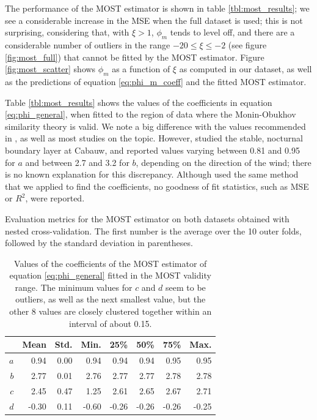 \documentclass[a4paper]{book}
\begin{document}
The performance of the MOST estimator is shown in table \ref{tbl:most_results}; we see a considerable increase in the MSE when the full dataset is used; this is not surprising, considering that, with $\xi>1$, $\phi_m$ tends to level off, and there are a considerable number of outliers in the range $-20\leq\xi\leq-2$ (see figure \ref{fig:most_full}) that cannot be fitted by the MOST estimator. Figure \ref{fig:most_scatter} shows $\phi_m$ as a function of $\xi$ as computed in our dataset, as well as the predictions of equation \ref{eq:phi_m_coeff} and the fitted MOST estimator.
 
Table \ref{tbl:most_results} shows the values of the coefficients in equation \ref{eq:phi_general}, when fitted to the region of data where the Monin-Obukhov similarity theory is valid. We note a big difference with the values recommended in \cite{hogstrom88}, as well as most studies on the topic. However, \cite{cabauw_night_most} studied the stable, nocturnal boundary layer at Cabauw, and reported values varying between 0.81 and 0.95 for $a$ and between 2.7 and 3.2 for $b$, depending on the direction of the wind; there is no known explanation for this discrepancy. Although \cite{cabauw_night_most} used the same method that we applied to find the coefficients, no goodness of fit statistics, such as MSE or $R^2$, were reported.

\begin{table}[]
\centering
\caption{Evaluation metrics for the MOST estimator on both datasets obtained with nested cross-validation. The first number is the average over the 10 outer folds, followed by the standard deviation in parentheses.}
\label{tbl:most_results}

\end{table}

\begin{table}[]
\centering
\caption{Values of the coefficients of the MOST estimator of equation \ref{eq:phi_general} fitted in the MOST validity range. The minimum values for $c$ and $d$ seem to be outliers, as well as the next smallest value, but the other 8 values are closely clustered together within an interval of about 0.15.}
\label{tbl:most_coeffs}
\begin{tabular}{r|rrrrrrr}
\toprule
   & \textbf{Mean} & \textbf{Std.} & \textbf{Min.} & \textbf{25\%} & \textbf{50\%} & \textbf{75\%} & \textbf{Max.} \\ \midrule
$a$ & 0.94 & 0.00 & 0.94 & 0.94 & 0.94 & 0.95 & 0.95 \\
$b$ & 2.77 & 0.01 & 2.76 & 2.77 & 2.77 & 2.78 & 2.78 \\
$c$ & 2.45 & 0.47 & 1.25 & 2.61 & 2.65 & 2.67 & 2.71 \\
$d$ & -0.30 & 0.11 & -0.60 & -0.26 & -0.26 & -0.26 & -0.25 \\
\bottomrule
\end{tabular}
\end{table}
\end{document}
